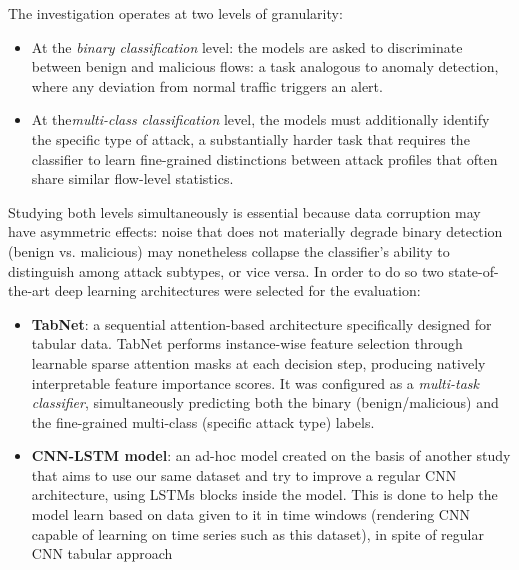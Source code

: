 \documentclass[../main.tex]{subfiles}
\begin{document}
The investigation operates at two levels of granularity:
\begin{itemize}
    \item At the \emph{binary classification} level: the models are asked to discriminate between benign and malicious flows: a task analogous to anomaly detection, where any deviation from normal traffic triggers an alert.
    \item   At the\emph{multi-class classification} level, the models must additionally identify the specific type of attack, a substantially harder task that requires the classifier to learn fine-grained distinctions between attack profiles that often share similar flow-level statistics. 
\end{itemize}

Studying both levels simultaneously is essential because data corruption may have asymmetric effects: noise that does not materially degrade binary detection (benign vs. malicious) may nonetheless collapse the classifier's ability to distinguish among attack subtypes, or vice versa. In order to do so two state-of-the-art deep learning architectures were selected for the evaluation:

\begin{itemize}
    \item \textbf{TabNet}: a sequential attention-based architecture specifically designed for tabular data.  TabNet performs instance-wise feature selection through learnable sparse attention masks at each decision step, producing natively interpretable feature importance scores.  It was configured as a \emph{multi-task classifier}, simultaneously predicting both the binary (benign/malicious) and the fine-grained multi-class (specific attack type) labels.
    \item \textbf{CNN-LSTM model}: an ad-hoc model created on the basis of another study that aims to use our same dataset and try to improve a regular CNN architecture, using LSTMs blocks inside the model. This is done to help the model learn based on data given to it in time windows (rendering CNN capable of learning on time series such as this dataset), in spite of regular CNN tabular approach
\end{itemize}
\end{document}

